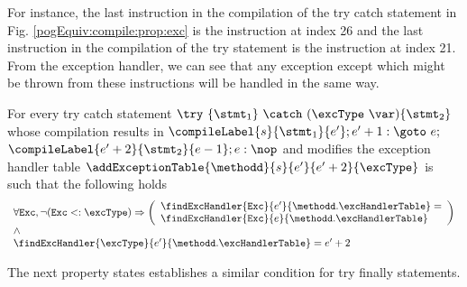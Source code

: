 For instance, the last instruction in the compilation of the try catch statement  in Fig. \ref{pogEquiv:compile:prop:exc} 
is the instruction at index 26 and the last instruction in the compilation of the try statement is the instruction at index 21. 
From the exception handler, we can see that any exception except \NullPointerExc{} which might be thrown from these instructions 
will be handled in the same way. 
 
\begin{compProp}\label{compile:prop:compProp10}
For every try catch statement $ \try \ \{ \stmt_1 \} \ \catch \ (\excType \ \var )\{ \stmt_2 \}  $ 
whose compilation  results in 
$ \compileLabel{s}{\stmt_1}{e'}; e' + 1: \goto \ e;  $ $\compileLabel{e' + 2 }{\stmt_2}{e - 1}; e: \nop$
and modifies the exception handler table  
	$\addExceptionTable{\methodd}{ s }{ e'  }{ e' + 2 }{\excType} $
is such that the following holds 
$$\begin{array}{l} \forall \mbox{\rm{\texttt{Exc}}},  \neg ( \mbox{\rm{\texttt{Exc}}} <: \excType ) \Rightarrow
  \left( \begin{array}{l}  
         \findExcHandler{\mbox{\rm\tt{Exc}} }{e'}{\methodd.\excHandlerTable} =\\ 
    \findExcHandler{\mbox{\rm\tt{Exc}} }{e}{\methodd.\excHandlerTable}  \\
   \end{array}\right) \\
   \wedge\\
  \findExcHandler{\excType }{e'}{\methodd.\excHandlerTable} = e'+2 \\ 
 \end{array} $$

\end{compProp}

The next property states establishes a similar condition for try finally statements.

